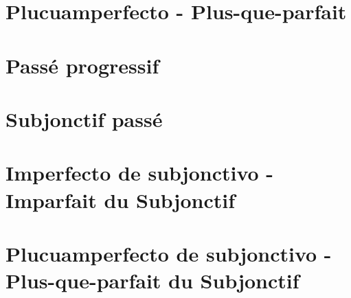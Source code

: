 \section{Plucuamperfecto - Plus-que-parfait}
\section{Passé progressif}
\section{Subjonctif passé}
\section{Imperfecto de subjonctivo - Imparfait du Subjonctif}
\section{Plucuamperfecto de subjonctivo - Plus-que-parfait du Subjonctif}